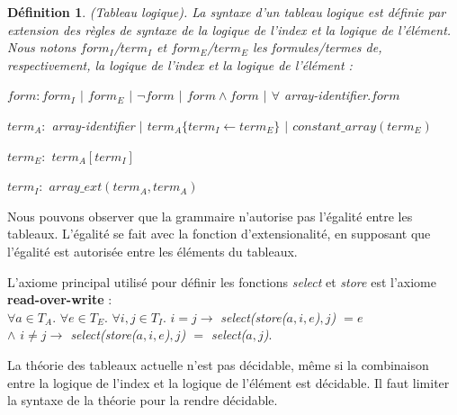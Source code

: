 \documentclass[9pt,openany]{book}
\newtheorem{definition}{D\'efinition}[section]
\begin{document}
	\begin{definition}
(Tableau logique). La syntaxe d'un tableau logique est d\'efinie par extension des r\`egles de syntaxe de la logique de l'index et la logique de l'\'el\'ement. Nous notons $form_{I}$/$term_{I}$ et $form_{E}$/$term_{E}$ les formules/termes de, respectivement, la logique de l'index et la logique de l'\'el\'ement :\par
$form : form_{I}$ $|$ $form_{E}$ $|$ $\neg form$ $|$ $form\land form$ $|$ $\forall$ array-identifier$. form$\par
$term_{A} :$ array-identifier $|$ $term_{A}\{term_{I}\leftarrow term_{E}\}$ $|$ $constant\_array(term_{E})$\par
$term_{E} :$ $term_{A}[term_{I}]$\par
$term_{I} :$ $array\_ext(term_{A},term_{A})$

\end{definition}
	Nous pouvons observer que la grammaire n'autorise pas l'\'egalit\'e entre les tableaux. L'\'egalit\'e se fait avec la fonction d'extensionalit\'e, en supposant que l'\'egalit\'e est autoris\'ee entre les \'el\'ements du tableaux.\par
	L'axiome principal utilis\'e pour d\'efinir les fonctions \textit{select} et \textit{store} est l'axiome \textbf{read-over-write} :\\
	$\forall a\in T_{A}.$ $\forall e\in T_{E}.$ $\forall i,j\in T_{I}.$ $i=j \rightarrow$ \textit{select(store($a,i,e$)$,j$) $ = e$
			\\ $\land$ $i\neq j \rightarrow$ select(store($a,i,e$)$,j$) $=$ select($a,j$)}.\par
	La th\'eorie des tableaux actuelle n'est pas d\'ecidable, m\^eme si la combinaison entre la logique de l'index et la logique de l'\'el\'ement est d\'ecidable. Il faut limiter la syntaxe de la th\'eorie pour la rendre d\'ecidable.
\end{document}
